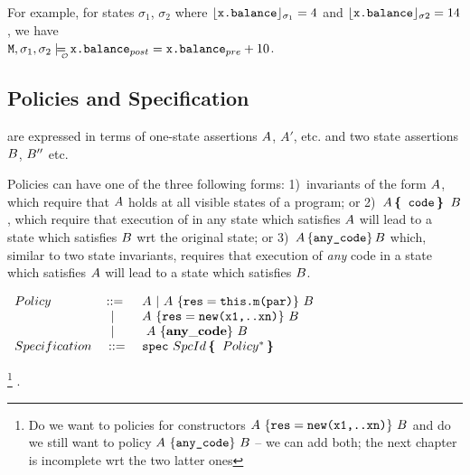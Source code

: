 \noindent
  For example, for states $\sigma_1$, $\sigma_2$ where
${\lfloor{ {{\ensuremath{\textrm{\ttfamily{x.balance}}}}}}\rfloor_{\sigma_1}}  = 4$  and ${\lfloor{ {{\ensuremath{\textrm{\ttfamily{x.balance}}}}}}\rfloor_{\sigma2}}  = 14$,
we have\\
\noindent  $\Prog{},\sigma_1,\sigma_2\modelsWithO \prg{x.balance}\POST = \prg{x.balance}\PRE+10$.



\subsection{Policies and Specification} are expressed in terms of one-state assertions $A$, $A'$, etc. and two state assertions $B$, $B''$ etc.

Policies can have one of the three following forms:
1)~invariants of the form $A$, which require that $A$ holds at all visible states of a
program; or
2)\  $A\, \mbox{\tt{\bf{\{ }}} \, {\textrm{\ttfamily{code}}}\, {\mbox{\tt{\bf{\} }}}}\, B$, which require that execution of  in any state which satisfies $A$ will lead to a state
 which satisfies $B$ wrt the original state;
 or
 3)\ $A\, \{{\textrm{\ttfamily{any\_code}}}\}\, B$ which, similar to two state invariants, requires that execution of {\em any} code in a state which satisfies $A$ will lead to a state which satisfies $B$.


\begin{definition}
\label{def:polAndSpec}
 $ ~ $ \\
 $
\begin{array}{lclcl}
Policy & \BBC & \ \A \ | \  \A \ \{ \prg{res}=\prg{this.m(par)} \}\  \B \ \\
 & | \ & \   \A \ \{ \prg{res}=\prg{new(x1,..xn)} \}\  \B \\
 & | \ & \ \ \A \ \{ \kw{any\_code} \}\ \B
\\
Specification & \  \BBC  & \  \prg{spec}\ SpcId \, \lb\, Policy^*\, \rb
\end{array}
$
\end{definition}

\footnote{Do we want to policies for constructors $ A \ \{ {\textrm{\ttfamily{res}}}={\textrm{\ttfamily{new(x1,..xn)}}} \}\  B$ and do we still want to policy
$A \ \{ {\textrm{\ttfamily{any\_code}}} \}\ B$ -- we can add both; the next chapter is incomplete wrt the two latter ones}
.

